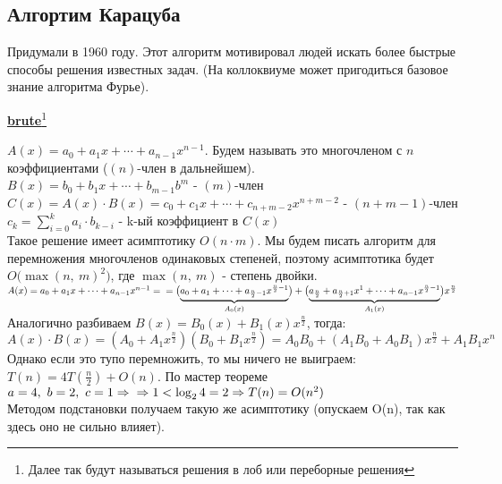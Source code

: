\documentclass[12pt, a4paper]{article}
\begin{document}
    \subsection{Алгортим Карацуба}
    \hspace{0.5cm}Придумали в 1960 году. Этот алгоритм мотивировал людей искать более быстрые способы решения известных задач. (На коллоквиуме может пригодиться базовое знание алгоритма Фурье).
    \begin{center}
        \underline{\textbf{brute}}\footnote[1]{Далее так будут называться решения в лоб или переборные решения}
    \end{center}
    $A(x) = a_0 + a_1 x + \cdots + a_{n - 1}x^{n - 1}$. Будем называть это многочленом с $n$ коэффициентами ($(n)$-член в дальнейшем).\\
    $B(x) = b_0 + b_1 x + \cdots + b_{m - 1}b^m$ - $(m)$-член\\
    $C(x) = A(x)\cdot B(x) = c_0 + c_1 x + \cdots + c_{n + m - 2}x^{n + m - 2}$ - $(n + m - 1)$-член\\
    $c_k = \displaystyle \sum_{i = 0}^{k} a_i\cdot b_{k - i}$ - k-ый коэффициент в $C(x)$\\
    Такое решение имеет асимптотику $O(n\cdot m)$. Мы будем писать алгоритм для перемножения многочленов одинаковых степеней, поэтому асимптотика будет $O\big(\max(n,\ m)^2\big)$, где $\max(n,\ m)$ - степень двойки.\\
    $A(x) = a_0 + a_1 x + \cdots + a_{n - 1}x^{n - 1} =\\
    =\big(\underset{A_0(x)}{\underbrace{a_0 + a_1 + \dots + a_{\frac{n}{2} - 1}x^{\frac{n}{2} - 1}}}\big) + \big( \underset{A_1(x)}{\underbrace{a_{\frac{n}{2}} + a_{\frac{n}{2} + 1}x^{1} + \dots + a_{n - 1} x^{\frac{n}{2} - 1}}} \big)x^{\frac{n}{2}}$\\
    Аналогично разбиваем $B(x) = B_0(x) + B_1(x)x^{\frac{n}{2}}$, тогда:\\
    $A(x)\cdot B(x) = (A_0 + A_1 x^{\frac{n}{2}})(B_0 + B_1 x^{\frac{n}{2}}) = A_0 B_0 + (A_1 B_0 + A_0 B_1)x^{\frac{n}{2}} + A_1 B_1 x^n$\\
    Однако если это тупо перемножить, то мы ничего не выиграем:\\
    $T(n) = 4T\left(\frac{n}{2}\right) + O(n)$. По мастер теореме $a = 4,\ b = 2,\ c = 1\Rightarrow\\
    \Rightarrow 1 < \log_2 4 = 2\Rightarrow T(n) = O(n^2)$\\
    Методом подстановки получаем такую же асимптотику (опускаем O(n), так как здесь оно не сильно влияет).\\
\end{document}
